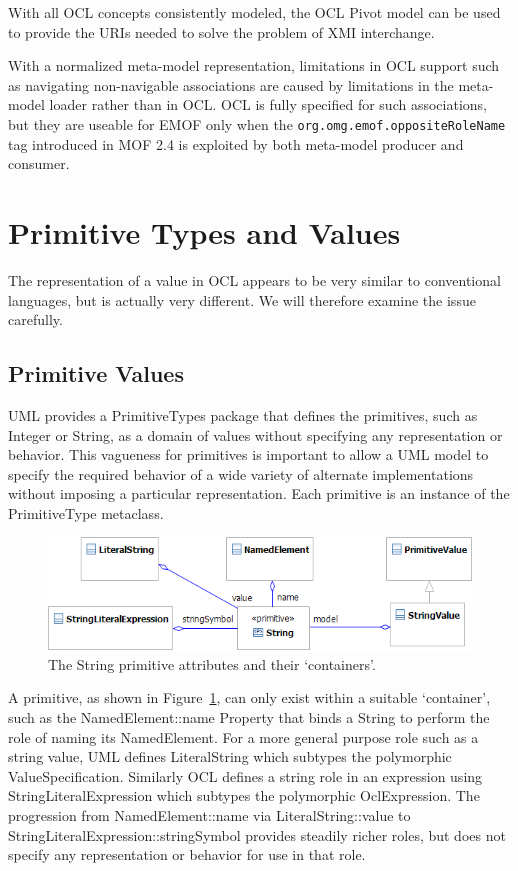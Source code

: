 \documentclass{eceasst}
\begin{document}
With all OCL concepts consistently modeled, the OCL Pivot model can be used to provide the URIs needed to solve the problem of XMI interchange.

With a normalized meta-model representation, limitations in OCL support such as navigating non-navigable associations are caused by limitations in the meta-model loader rather than in OCL. OCL is fully specified for such associations, but they are useable for EMOF only when the \verb|org.omg.emof.oppositeRoleName| tag introduced in MOF 2.4\cite{MOF-2.4} is exploited by both meta-model producer and consumer.

\section{Primitive Types and Values}\label{Values}

The representation of a value in OCL appears to be very similar to conventional languages, but is actually very different. We will therefore examine the issue carefully.

\subsection{Primitive Values}

UML provides a PrimitiveTypes package that defines the primitives, such as Integer or String, as a domain of values without specifying any representation or behavior. This vagueness for primitives is important to allow a UML model to specify the required behavior of a wide variety of alternate implementations without imposing a particular representation. Each primitive is an instance of the PrimitiveType metaclass.

\begin{figure}
  \begin{center}
    \includegraphics[width=5.75in]{String.png}
  \end{center}
  \caption{The String primitive attributes and their `containers'.}
  \label{fig:String}
\end{figure}

A primitive, as shown in Figure~\ref{fig:String}, can only exist within a suitable `container', such as the NamedElement::name Property that binds a String to perform the role of naming its NamedElement.  For a more general purpose role such as a string value, UML defines LiteralString which subtypes the polymorphic ValueSpecification. Similarly OCL defines a string role in an expression using StringLiteralExpression which subtypes the polymorphic OclExpression. The progression from NamedElement::name via LiteralString::value to StringLiteralExpression::stringSymbol provides steadily richer roles, but does not specify any representation or behavior for use in that role.
\end{document}
